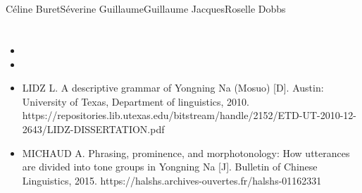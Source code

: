 	\section{ } \label{sec:thks}
	
	Céline BuretSéverine GuillaumeGuillaume JacquesRoselle Dobbs	

	\section{} \label{sec:refs}
	\begin{itemize}
		\item {}
		\item {}
		\item LIDZ L. A descriptive grammar of Yongning Na (Mosuo) [D]. Austin: University of Texas, Department of linguistics, 2010.
		https://repositories.lib.utexas.edu/bitstream/handle/2152/ETD-UT-2010-12-2643/LIDZ-DISSERTATION.pdf
		\item MICHAUD A. Phrasing, prominence, and morphotonology: How utterances are divided into tone groups in Yongning Na [J]. Bulletin of Chinese Linguistics, 2015. https://halshs.archives-ouvertes.fr/halshs-01162331
	\end{itemize}


 

	

